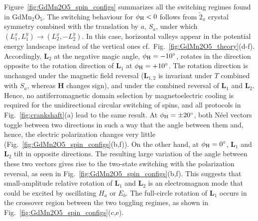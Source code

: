 Figure~\ref{fig:GdMn2O5_spin_configs} summarizes all the switching regimes found in GdMn$_2$O$_5$.
%
The switching behaviour for $\phi_{\rm H} < 0$ follows from  $\tilde{2}_x$ crystal symmetry combined with the translation by $a$, $S_a$, under which $(L_1^x,L_1^y) \rightarrow (L_2^x,-L_2^y)$. In this case, horizontal valleys appear in the potential energy landscape instead of the vertical ones cf.~Fig.~\ref{fig:GdMn2O5_theory}(d-f). Accordingly, $\mathbf{L}_2$ at the negative magic angle, $\phi_{\rm H} = -10^\circ$,  rotates in the direction opposite to the rotation direction of $\mathbf{L}_1$ at $\phi_{\rm H} = +10^\circ$. The rotation direction is unchanged under the magnetic field reversal ($\mathbf{L}_{1,2}$ is invariant under $T$ combined with $S_a$, whereas $\mathbf{H}$ changes sign), and under the combined reversal of $\mathbf{L}_{1}$ and $\mathbf{L}_{2}$. Hence, no antiferromagnetic domain selection by magnetoelectric cooling is required for the unidirectional circular switching of spins, and all protocols in Fig.~\ref{fig:crankshaft}(a) lead to the same result.
%
At $\phi_{\rm H} = \pm 20^\circ$, both N\'eel vectors toggle between two directions in such a way that the angle between them and, hence, the electric polarization changes very little (Fig.~\ref{fig:GdMn2O5_spin_configs}(b,f)). 
On the other hand, at $\phi_{\rm H}=0^\circ$, $\mathbf{L}_1$ and  $\mathbf{L}_2$ tilt in opposite directions. The resulting large variation of the angle between these two vectors gives rise to the two-state switching with the polarization reversal, as seen in Fig.~\ref{fig:GdMn2O5_spin_configs}(b,f). This suggests that small-amplitude relative rotation of $\mathbf{L}_1$ and $\mathbf{L}_2$ is an electromagnon mode that could be excited by oscillating $H_a$ or $E_b$. 
%
The full-circle rotation of  $\mathbf{L}_1$ occurs in the crossover region between the two toggling regimes, as shown in Fig.~\ref{fig:GdMn2O5_spin_configs}(c,e).

